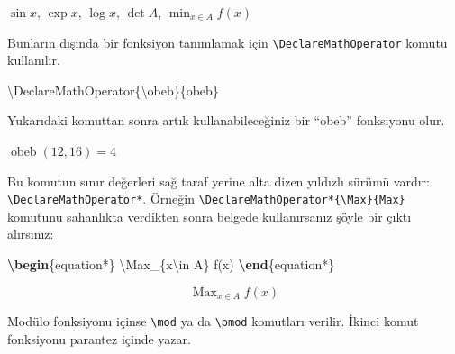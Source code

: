 \documentclass[
  10pt,
]{scrbook}
\newenvironment{Shaded}{\begin{snugshade}}{\end{snugshade}}
\newcommand{\ExtensionTok}[1]{#1}
\newcommand{\FunctionTok}[1]{\textcolor[rgb]{0.00,0.00,0.00}{#1}}
\newcommand{\KeywordTok}[1]{\textcolor[rgb]{0.13,0.29,0.53}{\textbf{#1}}}
\newcommand{\NormalTok}[1]{#1}
\newcommand{\SpecialCharTok}[1]{\textcolor[rgb]{0.00,0.00,0.00}{#1}}
\newcommand{\SpecialStringTok}[1]{\textcolor[rgb]{0.31,0.60,0.02}{#1}}
\DeclareMathOperator{\obeb}{obeb}
\DeclareMathOperator*{\Max}{Max}
\theoremstyle{definition}
\theoremstyle{definition}
\theoremstyle{definition}
\theoremstyle{definition}
\theoremstyle{remark}
\begin{document}
\(\sin x\), \(\exp x\), \(\log x\), \(\det A\), \(\min_{x\in A} f(x)\)

Bunların dışında bir fonksiyon tanımlamak için \texttt{\textbackslash{}DeclareMathOperator} komutu kullanılır.

\begin{Shaded}
\begin{Highlighting}[]
\FunctionTok{\textbackslash{}DeclareMathOperator}\NormalTok{\{}\FunctionTok{\textbackslash{}obeb}\NormalTok{\}\{obeb\}}
\end{Highlighting}
\end{Shaded}

Yukarıdaki komuttan sonra artık kullanabileceğiniz bir ``obeb'' fonksiyonu olur.

\begin{Shaded}
\end{Shaded}

\(\obeb(12,16)=4\)

Bu komutun sınır değerleri sağ taraf yerine alta dizen yıldızlı sürümü vardır: \texttt{\textbackslash{}DeclareMathOperator*}. Örneğin \texttt{\textbackslash{}DeclareMathOperator*\{\textbackslash{}Max\}\{Max\}} komutunu sahanlıkta verdikten sonra belgede kullanırsanız şöyle bir çıktı alırsınız:

\begin{Shaded}
\begin{Highlighting}[]
\KeywordTok{\textbackslash{}begin}\NormalTok{\{}\ExtensionTok{equation*}\NormalTok{\}}
\SpecialStringTok{ }\SpecialCharTok{\textbackslash{}Max}\SpecialStringTok{\_\{x}\SpecialCharTok{\textbackslash{}in}\SpecialStringTok{ A\} f(x)}
\KeywordTok{\textbackslash{}end}\NormalTok{\{}\ExtensionTok{equation*}\NormalTok{\}}
\end{Highlighting}
\end{Shaded}

\begin{equation*}
 \Max_{x\in A} f(x)
\end{equation*}

Modülo fonksiyonu içinse \texttt{\textbackslash{}mod} ya da \texttt{\textbackslash{}pmod} komutları verilir. İkinci komut fonksiyonu parantez içinde yazar.

\begin{Shaded}
\end{Shaded}
\end{document}
